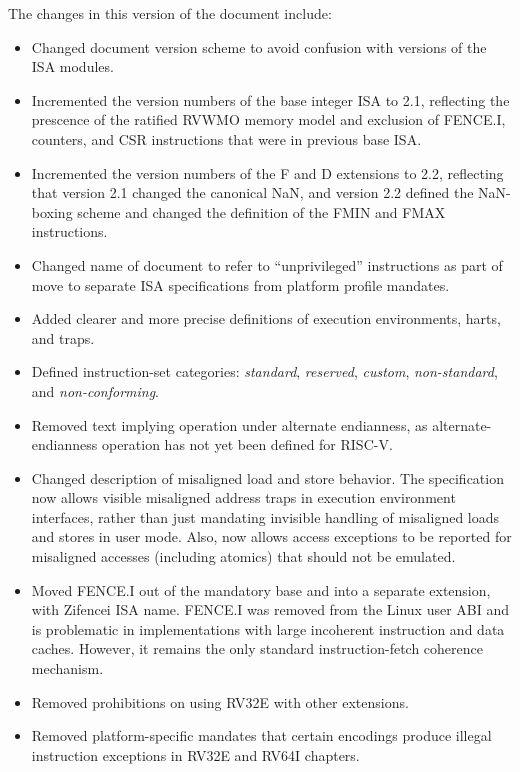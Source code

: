 The changes in this version of the document include:
\vspace{-0.2in}
\begin{itemize}
\parskip 0pt
\itemsep 1pt
\item Changed document version scheme to avoid confusion with versions
  of the ISA modules.
\item Incremented the version numbers of the base integer ISA to 2.1,
  reflecting the prescence of the ratified RVWMO memory model and
  exclusion of FENCE.I, counters, and CSR instructions that were in
  previous base ISA.
\item Incremented the version numbers of the F and D extensions to 2.2,
  reflecting that version 2.1 changed the canonical NaN, and version
  2.2 defined the NaN-boxing scheme and changed the definition of the
  FMIN and FMAX instructions.
\item Changed name of document to refer to ``unprivileged''
  instructions as part of move to separate ISA specifications from
  platform profile mandates.
\item Added clearer and more precise definitions of execution
  environments, harts, and traps.
\item Defined instruction-set categories: {\em standard}, {\em
  reserved}, {\em custom}, {\em non-standard}, and {\em
  non-conforming}.
\item Removed text implying operation under alternate endianness, as
  alternate-endianness operation has not yet been defined for RISC-V.
\item Changed description of misaligned load and store behavior.  The
  specification now allows visible misaligned address traps in
  execution environment interfaces, rather than just mandating
  invisible handling of misaligned loads and stores in user mode.
  Also, now allows access exceptions to be reported for misaligned
  accesses (including atomics) that should not be emulated. 
\item Moved FENCE.I out of the mandatory base and into a separate extension,
  with Zifencei ISA name.  FENCE.I was removed from the Linux user ABI and is
  problematic in implementations with large incoherent instruction and
  data caches.  However, it remains the only standard
  instruction-fetch coherence mechanism.
\item Removed prohibitions on using RV32E with other extensions.
\item Removed platform-specific mandates that certain encodings
  produce illegal instruction exceptions in RV32E and RV64I chapters.

\end{itemize}
